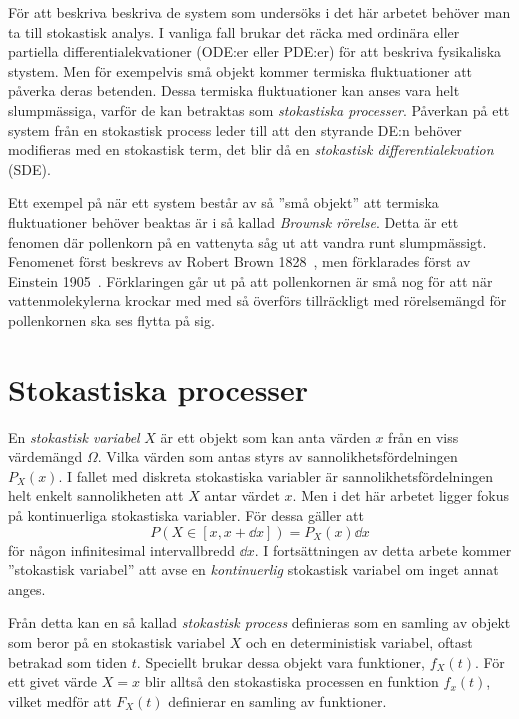 
För att beskriva beskriva de system som undersöks i det här arbetet
behöver man ta till stokastisk analys. I vanliga fall brukar
det räcka med ordinära eller partiella differential\-ekvationer (ODE:er
eller PDE:er) för att beskriva fysikaliska stystem. Men för exempelvis
små objekt kommer termiska fluktuationer att påverka deras
betenden. Dessa termiska fluktuationer kan anses vara helt
slumpmässiga, varför de kan betraktas som \emph{stokastiska
  processer}. Påverkan på ett system från en stokastisk process leder
till att den styrande DE:n behöver modifieras med en stokastisk term,
det blir då en \emph{stokastisk differentialekvation} (SDE).

Ett exempel på när ett system består av så ''små objekt'' att termiska
fluktuationer behöver beaktas är i så kallad \emph{Brownsk
  rörelse}. Detta är ett fenomen där pollenkorn på en vattenyta såg ut
att vandra runt slumpmässigt. Fenomenet först beskrevs av Robert Brown
1828~\cite{Brown1828}, men förklarades först av Einstein
1905~\cite{Einstein1905}. Förklaringen går ut på att pollenkornen är
små nog för att när vattenmolekylerna krockar med med så överförs
tillräckligt med rörelsemängd för pollenkornen ska ses flytta på sig. 

\section{Stokastiska processer}
En \emph{stokastisk variabel} $X$ är ett objekt som kan anta värden
$x$ från en viss värdemängd $\Omega$. Vilka värden som antas styrs av
sannolikhetsfördelningen $P_X(x)$. I fallet med diskreta stokastiska
variabler är sannolikhetsfördelningen helt enkelt sannolikheten att
$X$ antar värdet $x$. Men i det här arbetet ligger fokus på
kontinuerliga stokastiska variabler. För dessa gäller att 
\begin{equation}
P(X\in[x, x+\dd{x}]) =P_X(x)\dd{x}
\end{equation}
för någon infinitesimal intervallbredd $\dd{x}$. 
I fortsättningen av detta arbete kommer ''stokastisk variabel'' att
avse en \emph{kontinuerlig} stokastisk variabel om inget annat anges.


Från detta kan en så kallad \emph{stokastisk process} definieras som en
samling av objekt som beror på en stokastisk variabel $X$ och en
deterministisk variabel, oftast betrakad som tiden\footnotemark{}
$t$. Speciellt brukar dessa objekt vara 
funktioner, $f_X(t)$. För ett givet värde $X=x$ blir alltså den
stokastiska processen en funktion $f_x(t)$, vilket medför att $F_X(t)$
definierar en samling av funktioner. 


